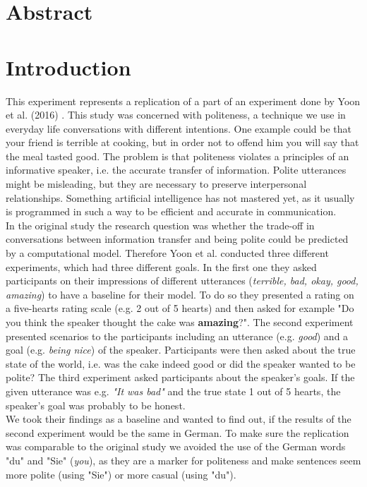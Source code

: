 \documentclass[a4paper,11pt]{article}
\title{}
\author{}
\begin{document}
\maketitle

\section{Abstract}

\section{Introduction}
This experiment represents a replication of a part of an experiment done by Yoon et al. (2016) \cite{yoon2016talking}. This study was concerned with politeness, a technique we use in everyday life conversations with different intentions. One example could be that your friend is terrible at cooking, but in order not to offend him you will say that the meal tasted good. The problem is that politeness violates a principles of an informative speaker, i.e. the accurate transfer of information. Polite utterances might be misleading, but they are necessary to preserve interpersonal relationships. Something artificial intelligence has not mastered yet, as it usually is programmed in such a way to be efficient and accurate in communication. \\ In the original study the research question was whether the trade-off in conversations between information transfer and being polite could be predicted by a computational model. Therefore Yoon et al. \cite{yoon2016talking} conducted three different experiments, which had three different goals. In the first one they asked participants on their impressions of different utterances (\textit{terrible, bad, okay, good, amazing}) to have a baseline for their model. To do so they presented a rating on a five-hearts rating scale (e.g. 2 out of 5 hearts) and then asked for example "Do you think the speaker thought the cake was \textbf{amazing}?". The second experiment presented scenarios to the participants including an utterance (e.g. \textit{good}) and a goal (e.g. \textit{being nice}) of the speaker. Participants were then asked about the true state of the world, i.e. was the cake indeed good or did the speaker wanted to be polite? The third experiment asked participants about the speaker's goals. If the given utterance was e.g. \textit{"It was bad"} and the true state 1 out of 5 hearts, the speaker's goal was probably to be honest. \\ We took their findings as a baseline and wanted to find out, if the results of the second experiment would be the same in German. To make sure the replication was comparable to the original study we avoided the use of the German words "du" and "Sie" (\textit{you}), as they are a marker for politeness and make sentences seem more polite (using "Sie") or more casual (using "du"). 
\end{document}
